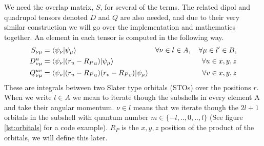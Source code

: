 We need the overlap matrix, $S$, for several of the terms. 
The related dipol and quadrupol tensors denoted $D$ and $Q$ are also needed, and due to their very similar construction we will go over the implementation and mathematics together. 
An element in each tensor is computed in the following way.
\begin{align}
    S_{\nu\mu} &= \braket{\psi_\nu|\psi_\mu} &\forall \nu \in l \in A,\quad\forall\mu \in l' \in B, \\
    D_{\nu\mu}^{u} &= \braket{\psi_\nu|(r_u-{R_P}_u)|\psi_\mu}  &\forall  u\in x,y,z\\
    Q_{\nu\mu}^{uv} &= \braket{\psi_\nu|(r_u-{R_P}_u)(r_v-{R_P}_v)|\psi_\mu} &\forall  v\in x,y,z
\end{align}
These are integrals between two Slater type orbitals (STOs) over the positions $r$. When we write $l \in A$ we mean to iterate though the subshells in every element A and take their angular momentum. $\nu\in l$ means that we iterate though the $2l+1$ orbitals in the subshell with quantum number $m\in\{-l,..,0,..,l\}$ (See figure \ref{lst:orbitals} for a code example). ${R_P}$ is the $x,y,z$ position of the product of the orbitals, we will define this later.


